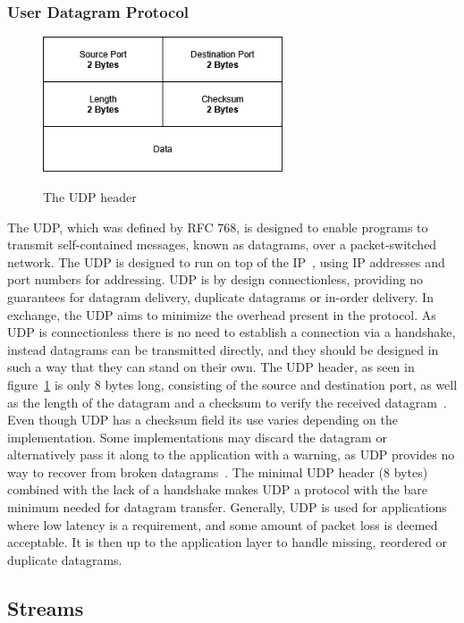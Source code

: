 \documentclass[english, 12pt, a4paper, elec, utf8, a-2b, online]{aaltothesis}
\begin{document}
\subsubsection{User Datagram Protocol \label{UDP}}
\label{sec:udp}
\begin{figure}[b]
	\centering
	\includegraphics[alt={A block diagram of the UDP header format, detailing its fields and their sizes.}, height=4cm]{./images/udp_header.png}
	\caption{The UDP header}
	\label{fig:udp_header}
\end{figure}
The UDP, which was defined by RFC 768, is designed to
enable programs to transmit self-contained messages, known as datagrams, over a
packet-switched network. The UDP is designed to run on top of the IP~\cite{rfc791},
using IP addresses and port numbers for addressing. UDP is by design connectionless,
providing no guarantees for datagram delivery, duplicate datagrams or in-order
delivery. In exchange, the UDP aims to minimize the overhead present in the protocol.
As UDP is connectionless there is no need to establish a connection via a handshake,
instead datagrams can be transmitted directly, and they should be designed in
such a way that they can stand on their own. The UDP header, as seen in figure~\ref{fig:udp_header}
is only 8 bytes long,
consisting of the source and destination port, as well as the length of the datagram
and a checksum to verify the received datagram~\cite{rfc768}. Even though UDP has
a checksum field its use varies depending on the implementation. Some implementations
may discard the datagram or alternatively pass it along to the application with a 
warning, as UDP provides no way to recover from broken datagrams~\cite{compute_rnetworking}. The minimal UDP
header (8 bytes) combined with the lack of a handshake makes UDP a protocol with
the bare minimum needed for datagram transfer.
Generally, UDP is used for applications where low latency is a requirement, and some
amount of packet loss is deemed acceptable. It is then up to the application layer to
handle missing, reordered or duplicate datagrams.

\subsection{Streams}
\end{document}

